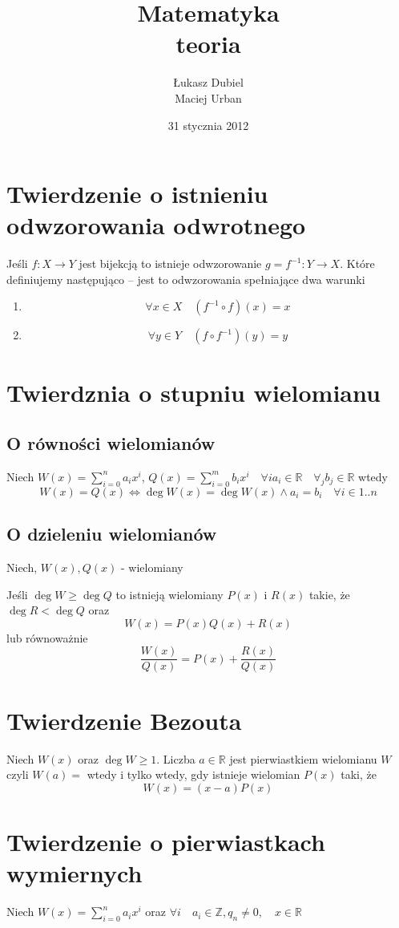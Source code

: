 \documentclass[11pt]{article}
\author{Łukasz Dubiel \\ Maciej Urban}
\title{Matematyka\\teoria}
\date{31 stycznia 2012}
\begin{document}
\maketitle
\section{Twierdzenie o istnieniu odwzorowania odwrotnego}
Jeśli $f : X \to Y$ jest bijekcją to istnieje odwzorowanie $g = f^{-1} : Y \to X$. Które definiujemy następująco -- jest to odwzorowania spełniające dwa warunki 
\begin{enumerate}
\item{$$\forall x \in X \quad (f^{-1} \circ f)(x) = x$$}
\item{$$\forall y \in Y \quad (f \circ f^{-1})(y) = y$$}
\end{enumerate}
\section{Twierdznia o stupniu wielomianu}
\subsection{O równości wielomianów}
Niech $W(x) = \sum_{i = 0}^n a_i x^i$, $Q(x) = \sum_{i = 0}^m b_ix^i\quad  \forall i a_i \in \mathbb{R} \quad \forall_j b_j \in \mathbb{R}$ wtedy
$$ W(x) = Q(x) \iff \deg{W(x)} = \deg{W(x)} \wedge a_i = b_i \quad \forall i \in {1..n}$$ 
\subsection{O dzieleniu wielomianów}
Niech, $W(x),Q(x)$ - wielomiany

Jeśli $\deg{W} \geq \deg{Q}$ to istnieją wielomiany $P(x)$ i $R(x)$ takie, że $\deg{R} < \deg{Q}$ oraz 
$$ W(x) = P(x)Q(x) + R(x)$$ lub równoważnie
$$ \frac{W(x)}{Q(x)} = P(x) + \frac{R(x)}{Q(x)}$$

\section{Twierdzenie Bezouta}
Niech $W(x)$ oraz $\deg{W} \geq 1$. Liczba $a \in \mathbb{R}$ jest pierwiastkiem wielomianu $W$ czyli $W(a) = $ wtedy i tylko wtedy, gdy istnieje wielomian $P(x)$ taki, że $$ W(x) = (x-a)P(x)$$

\section{Twierdzenie o pierwiastkach wymiernych}
Niech $W(x) = \sum_{i = 0}^n a_i x^i$ oraz $\forall i \quad a_i \in \mathbb{Z}, q_n \not = 0 , \quad x \in \mathbb{R} $
\end{document}
